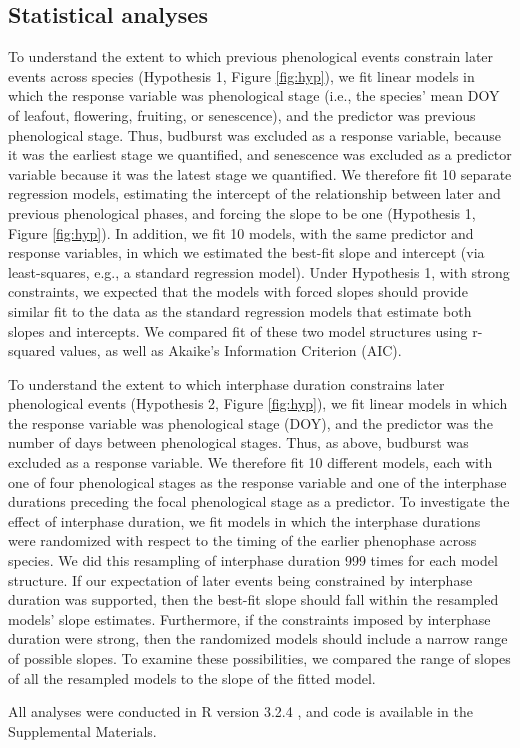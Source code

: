 \documentclass{article}
\begin{document}
\subsection*{Statistical analyses}
To understand the extent to which previous phenological events constrain later events across species (Hypothesis 1, Figure \ref{fig:hyp}), we fit linear models in which the response variable was phenological stage (i.e., the species' mean DOY of leafout, flowering, fruiting, or senescence), and the predictor was previous phenological stage. Thus, budburst was excluded as a response variable, because it was the earliest stage we quantified, and senescence was excluded as a predictor variable because it was the latest stage we quantified. We therefore fit 10 separate regression models, estimating the intercept of the relationship between later and previous phenological phases, and forcing the slope to be one (Hypothesis 1, Figure \ref{fig:hyp}). In addition, we fit 10 models, with the same predictor and response variables, in which we estimated the best-fit slope and intercept (via least-squares, e.g., a standard regression model). Under Hypothesis 1, with strong constraints, we expected that the models with forced slopes should provide similar fit to the data as the standard regression models that estimate both slopes and intercepts. We compared fit of these two model structures using r-squared values, as well as Akaike's Information Criterion (AIC). 
\par To understand the extent to which interphase duration constrains later phenological events (Hypothesis 2, Figure \ref{fig:hyp}), we fit linear models in which the response variable was phenological stage (DOY), and the predictor was the number of days between phenological stages. Thus, as above, budburst was excluded as a response variable. We therefore fit 10 different models, each with one of four phenological stages as the response variable and one of the interphase durations preceding the focal phenological stage as a predictor. To investigate the effect of interphase duration, we fit models in which the interphase durations were randomized with respect to the timing of the earlier phenophase across species. We did this resampling of interphase duration 999 times for each model structure. If our expectation of later events being constrained by interphase duration was supported, then the best-fit slope should fall within the resampled models' slope estimates. Furthermore, if the constraints imposed by interphase duration were strong, then the randomized models should include a narrow range of possible slopes. To examine these possibilities, we compared the range of slopes of all the resampled models to the slope of the fitted model. 
\par All analyses were conducted in R version 3.2.4 \citep{rcoreteam2017}, and code is available in the Supplemental Materials.
\end{document}
